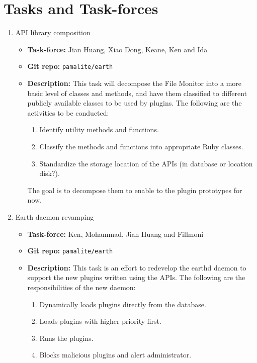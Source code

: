 \documentclass{article}
\begin{document}
\section*{Tasks and Task-forces}

\begin{enumerate}
   \item API library composition
      \begin{itemize}
         \item \textbf{Task-force:} Jian Huang, Xiao Dong, Keane, Ken and Ida
         \item \textbf{Git repo:} \texttt{pamalite/earth}
         \item \textbf{Description:} This task will decompose the File Monitor into a more basic level of classes and methods, and have them classified to different publicly available classes to be used by plugins. The following are the activities to be conducted: 
            \begin{enumerate}
               \item Identify utility methods and functions.
               \item Classify the methods and functions into appropriate Ruby classes.
               \item Standardize the storage location of the APIs (in database or location disk?). 
            \end{enumerate}
The goal is to decompose them to enable to the plugin prototypes for now.
      \end{itemize}
   \item Earth daemon revamping
      \begin{itemize}
         \item \textbf{Task-force:} Ken, Mohammad, Jian Huang and Fillmoni
         \item \textbf{Git repo:} \texttt{pamalite/earth}
         \item \textbf{Description:} This task is an effort to redevelop the earthd daemon to support the new plugins written using the APIs. The following are the responsibilities of the new daemon:
            \begin{enumerate}
               \item Dynamically loads plugins directly from the database. 
               \item Loads plugins with higher priority first. 
               \item Runs the plugins.
               \item Blocks malicious plugins and alert administrator. 

\end{enumerate}
\end{itemize}
\end{enumerate}
\end{document}
